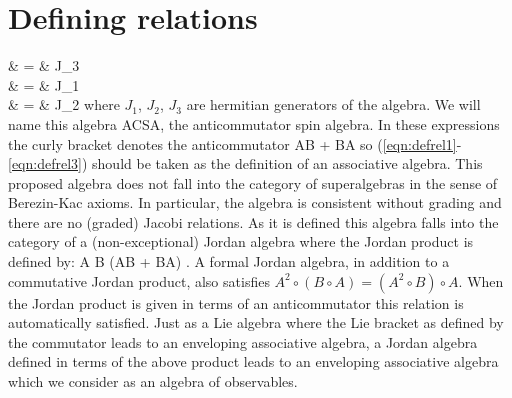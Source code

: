 \begin{comment}
The algebra of observables in quantum theory plays a fundamental
role. When classical systems are quantized, their classical
symmetry algebra acting on a set of physical observables, in
simplest examples, remains the same. For some completely
integrable non-linear models, consistent quantization requires
that the classical symmetry group be replaced by a quantum group
\cite{frt,drinfeld,woronowicz,manin} via a deformation parameter
$q = 1 + O(\hbar)$. In recent years quantum groups involving
fermions have received widespread attention. These include
deformed fermion algebras \cite{jx,xh,sm,chung}, spin chains
\cite{nt,gppr,bnnpsw} and Fermi gases \cite{ubriaco}. At the same
time, some quantum systems, most notably fermionic quantum systems
do not have any classical analogues. Nevertheless, fermions are
perhaps the most important sector of quantum phenomena. Motivated
by these considerations, we define a fermionic version of the
angular momentum algebra by the relations
\end{comment}


\section{Defining relations}

\bea
{} & = & J_3 \label{eqn:defrel1} \\
 & = & J_1 \label{eqn:defrel2} \\
 & = & J_2 \label{eqn:defrel3} 
\eea
where $J_1$, $J_2$, $J_3$ are hermitian generators of the algebra. We will name this algebra ACSA, the anticommutator spin algebra. In these expressions the curly bracket denotes the anticommutator \beq
{} \equiv AB + BA \eeq so (\ref{eqn:defrel1}-\ref{eqn:defrel3}) should be taken as the
definition of an associative algebra. This proposed algebra does
not fall into the category of superalgebras in the sense of
Berezin-Kac axioms. In particular, the algebra is consistent
without grading and there are no (graded) Jacobi relations. As it
is defined this algebra falls into the category of a
(non-exceptional) Jordan algebra where the Jordan product is
defined by: \beq A \circ B \equiv {} (AB + BA) \quad . \eeq A
formal Jordan algebra, in addition to a commutative Jordan
product, also satisfies $A^2\circ(B\circ A) = (A^2\circ B)\circ
A$. When the Jordan product is given in terms of an anticommutator
this relation is automatically satisfied. Just as a Lie algebra
where the Lie bracket as defined by the commutator leads to an
enveloping associative algebra, a Jordan algebra defined in terms
of the above product leads to an enveloping associative algebra
which we consider as an algebra of observables.

